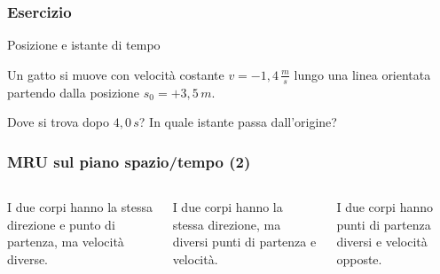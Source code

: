 \documentclass[]{beamer}
\theoremstyle{plain}
\begin{document}
\begin{frame}
\frametitle{Esercizio}
\begin{exampleblock}{Posizione e istante di tempo}
  \small{Un gatto si muove con velocità costante $ v = - 1,4 \, \frac{m}{s} $ lungo una linea orientata partendo dalla posizione $ s_0 = +3,5 \, m $. 

  Dove si trova dopo $ 4,0 \, s $? In quale istante passa dall'origine?}
\end{exampleblock}
\end{frame}


\begin{frame}
\frametitle{MRU sul piano spazio/tempo (2)}


\begin{columns}
\begin{column}{0.3\textwidth}
\begin{figure}\centering
{}
\end{figure}
{\small I due corpi hanno la stessa direzione e punto di partenza, ma velocità diverse.}
\end{column}
\begin{column}{0.3\textwidth}
\begin{figure}\centering
{}
\end{figure}
{\small I due corpi hanno la stessa direzione, ma diversi punti di partenza e velocità.}
\end{column}
\begin{column}{0.3\textwidth}
\begin{figure}\centering
{}
\end{figure}
{\small I due corpi hanno punti di partenza diversi e velocità opposte.}
\end{column}\end{columns}
\end{frame}
\end{document}
